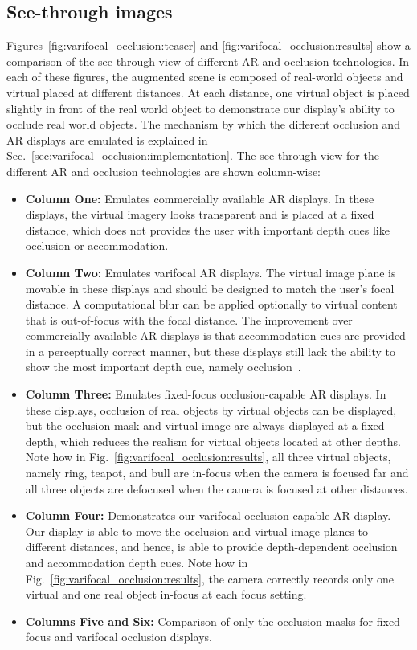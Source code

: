 
\subsection{See-through images}
\label{sec:results_images}
Figures~\ref{fig:varifocal_occlusion:teaser} and \ref{fig:varifocal_occlusion:results} show a comparison of the see-through view of different AR and occlusion technologies. In each of these figures, the augmented scene is composed of real-world objects and virtual placed at different distances. At each distance, one virtual object is placed slightly in front of the real world object to demonstrate our display's ability to occlude real world objects. The mechanism by which the different occlusion and AR displays are emulated is explained in Sec.~\ref{sec:varifocal_occlusion:implementation}. The see-through view for the different AR and occlusion technologies are shown column-wise:
\begin{itemize}
    \item \textbf{Column One:} Emulates commercially available AR displays. In these displays, the virtual imagery looks transparent and is placed at a fixed distance, which does not provides the user with important depth cues like occlusion or accommodation. 
    \item \textbf{Column Two:} Emulates varifocal AR displays. The virtual image plane is movable in these displays and should be designed to match the user's focal distance. A computational blur can be applied optionally to virtual content that is out-of-focus with the focal distance. The improvement over commercially available AR displays is that accommodation cues are provided in a perceptually correct manner, but these displays still lack the ability to show the most important depth cue, namely occlusion~\cite{cutting1995perceiving}.
    \item \textbf{Column Three:} Emulates fixed-focus occlusion-capable AR displays. In these displays, occlusion of real objects by virtual objects can be displayed, but the occlusion mask and virtual image are always displayed at a fixed depth, which reduces the realism for virtual objects located at other depths. Note how in Fig.~\ref{fig:varifocal_occlusion:results}, all three virtual objects, namely ring, teapot, and bull are in-focus when the camera is focused far and all three objects are defocused when the camera is focused at other distances.
    \item \textbf{Column Four:} Demonstrates our varifocal occlusion-capable AR display. Our display is able to move the occlusion and virtual image planes to different distances, and hence, is able to provide depth-dependent occlusion and accommodation depth cues. Note how in Fig.~\ref{fig:varifocal_occlusion:results}, the camera correctly records only one virtual and one real object in-focus at each focus setting.
    \item \textbf{Columns Five and Six:} Comparison of only the occlusion masks for fixed-focus and varifocal occlusion displays.
\end{itemize}

